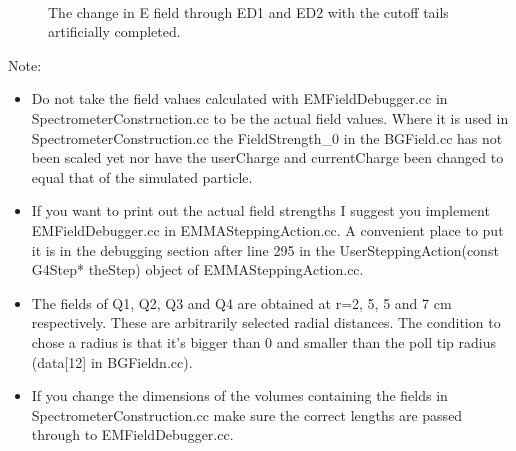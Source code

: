 \documentclass[letter,11pt]{article}
\newcommand{\filefont}[1]{{\scriptsize\ttfamily\selectfont #1}\xspace}
\begin{document}
\begin{figure}
\centering
	\\
	\caption{The change in E field through ED1 and ED2 with the cutoff tails artificially completed.}
	\label{fig:ed2}
\end{figure}


Note:
\begin{itemize}
\item Do not take the field values calculated with EMFieldDebugger.cc in SpectrometerConstruction.cc to be the actual field values. Where it is used in SpectrometerConstruction.cc the \filefont{FieldStrength\_0} in the BGField.cc has not been scaled yet nor have the \filefont{userCharge} and \filefont{currentCharge} been changed to equal that of the simulated particle. 
\item If you want to print out the actual field strengths I suggest you implement EMFieldDebugger.cc in EMMASteppingAction.cc. A convenient place to put it is in the debugging section after line 295 in the UserSteppingAction(const G4Step* theStep) object of EMMASteppingAction.cc.
\item The fields of Q1, Q2, Q3 and Q4 are obtained at r=2, 5, 5 and 7 cm respectively. These are arbitrarily selected radial distances. The condition to chose a radius is that it's bigger than 0 and smaller than the poll tip radius (\filefont{data[12]} in BGFieldn.cc).
\item If you change the dimensions of the volumes containing the fields in SpectrometerConstruction.cc make sure the correct lengths are passed through to EMFieldDebugger.cc.
\end{itemize}
\end{document}
